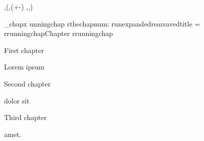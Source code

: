 \fontfam[LMfonts]



\grid 1pc,\baselineskip(\hoffset,\dimexpr(\voffset+\topskip-\baselineskip) ,\hsize ,\vsize)

\addto\_chapx { \vfil\break %
   \xdef\_runningchap {\_thechapnum: \_unexpanded\_ea{\_savedtitle}}}
\def \formathead #1#2{\isempty{#1}\iffalse #1: #2\fi}  
\headline = {%
\ifx\_runningchap\undefined \else Chapter \_runningchap \fi \hfil
}

\chap First chapter

Lorem ipsum

\chap Second chapter

dolor sit

\chap Third chapter

amet.

\bye